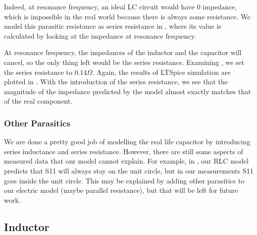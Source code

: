 \documentclass{article}
\begin{document}
Indeed, at resonance frequency, an ideal LC circuit would have $0$ impedance, which is impossible in the real world because there is always some resistance.
We model this parasitic resistance as series resistance in , where its value is calculated by looking at the impedance at resonance frequency.

At resonance frequency, the impedances of the inductor and the capacitor will cancel, so the only thing left would be the series resistance.
Examining , we set the series resistance to $0.14\Omega$.
Again, the results of LTSpice simulation are plotted in .
With the introduction of the series resistance, we see that the magnitude of the impedance predicted by the model almost exactly matches that of the real component.

\subsubsection{Other Parasitics}
We are done a pretty good job of modelling the real life capacitor by introducing series inductance and series resistance.
However, there are still some aspects of measured data that our model cannot explain.
For example, in , our RLC model predicts that S11 will always stay on the unit circle, but in our measurements S11 goes inside the unit circle.
This may be explained by adding other parasitics to our electric model (maybe parallel resistance), but that will be left for future work.

\subsection{Inductor}
\end{document}
